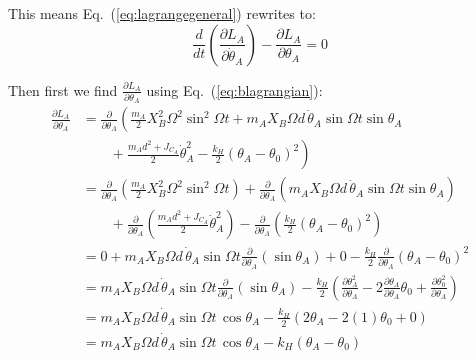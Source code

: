 \documentclass[titlepage]{article}
\begin{document}
This means Eq.~(\ref{eq:lagrangegeneral}) rewrites to:
\begin{equation}
	\frac{d}{dt}\left(\frac{\partial L_A}{\partial\dot{\theta}_A}\right)-\frac{\partial L_A}{\partial\theta_A}=0
\end{equation}

Then first we find $\frac{\partial L_A}{\partial\theta_A}$ using Eq.~(\ref{eq:blagrangian}):
\begin{equation}
	\begin{split}
		\frac{\partial L_A}{\partial\theta_A}&=\frac{\partial}{\partial\theta_A}\left(\frac{m_A}{2}X_B^2\Omega^2\sin^2\Omega t+m_AX_B\Omega d\,\dot{\theta}_A\sin\Omega t\sin\theta_A\right. \\
		&\left.\qquad+\frac{m_Ad^2+J_{C_A}}{2}\dot{\theta}_A^2-\frac{k_H}{2}\left(\theta_A-\theta_0\right)^2\right) \\
		&=\frac{\partial}{\partial\theta_A}\left(\frac{m_A}{2}X_B^2\Omega^2\sin^2\Omega t\right)+\frac{\partial}{\partial\theta_A}\left(m_AX_B\Omega d\,\dot{\theta}_A\sin\Omega t\sin\theta_A\right) \\
		&\qquad+\frac{\partial}{\partial\theta_A}\left(\frac{m_Ad^2+J_{C_A}}{2}\dot{\theta}_A^2\right)-\frac{\partial}{\partial\theta_A}\left(\frac{k_H}{2}\left(\theta_A-\theta_0\right)^2\right) \\
		&=0+m_AX_B\Omega d\,\dot{\theta}_A\sin\Omega t\frac{\partial}{\partial\theta_A}\left(\sin\theta_A\right)+0-\frac{k_H}{2}\frac{\partial}{\partial\theta_A}\left(\theta_A-\theta_0\right)^2 \\
		&=m_AX_B\Omega d\,\dot{\theta}_A\sin\Omega t\frac{\partial}{\partial\theta_A}\left(\sin\theta_A\right)-\frac{k_H}{2}\left(\frac{\partial\theta_A^2}{\partial\theta_A}-2\frac{\partial\theta_A}{\partial\theta_A}\theta_0+\frac{\partial\theta_0^2}{\partial\theta_A}\right) \\
		&=m_AX_B\Omega d\,\dot{\theta}_A\sin\Omega t\,\cos\theta_A-\frac{k_H}{2}\left(2\theta_A-2(1)\theta_0+0\right) \\
		&=m_AX_B\Omega d\,\dot{\theta}_A\sin\Omega t\,\cos\theta_A-k_H\left(\theta_A-\theta_0\right) \\
	\end{split}
\end{equation}

\newpage
\end{document}
